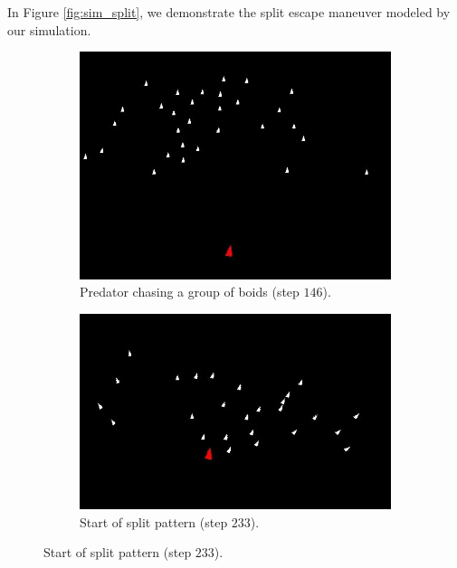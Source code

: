 \documentclass[9pt]{pnas-new}
\begin{document}
In Figure \ref{fig:sim_split}, we demonstrate the split escape maneuver modeled by our simulation.
\begin{figure}[h]
    \centering
    \begin{subfigure}[t]{0.3\linewidth}
        \includegraphics[width=\linewidth]{boids_step_146.jpg}
        \caption{Predator chasing a group of boids (step $146$).}
    \end{subfigure}%
    \hspace{0.02\linewidth} %
    \begin{subfigure}[t]{0.3\linewidth}
        \includegraphics[width=\linewidth]{boids_step_233.jpg}
        \caption{Start of split pattern (step $233$).}
    \end{subfigure}%
    \hspace{0.02\linewidth} %

\end{figure}
\end{document}
